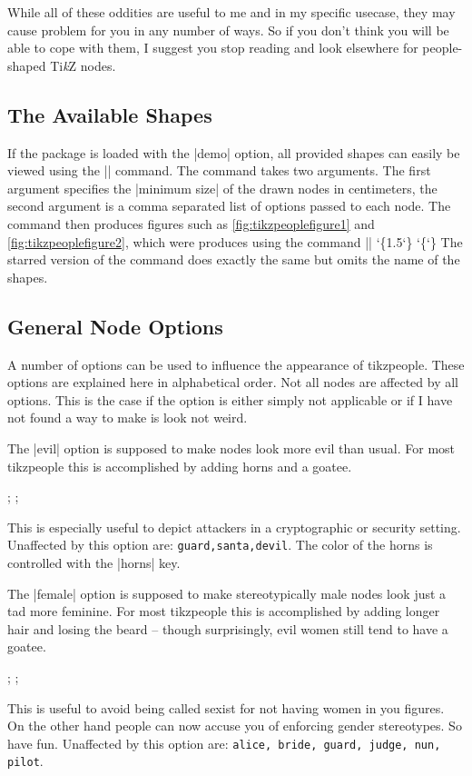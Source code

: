 \documentclass{ltxdoc}
\newcommand{\tikzname}{Ti\emph{k}Z\xspace}
\newcommand{\varg}[1]{%
	{\ttfamily\char`\{}#1{\ttfamily\char`\}}}
\newcommand{\DescribeOption}[1]{\leavevmode
	\marginpar{\raggedleft\strut\MacroFont\string #1\ }}
\begin{document}
	While all of these oddities are useful to me and in my specific usecase, they may cause problem for you in any number of ways.
	So if you don't think you will be able to cope with them, I suggest you stop reading and look elsewhere for people-shaped \tikzname nodes.

\subsection{The Available Shapes}
	\DescribeMacro{\alltikzpeople} If the package is loaded with the |demo| option, all provided shapes can easily be viewed using the |\alltikzpeople|\allowbreak{}\allowbreak{} command.
	The command takes two arguments. 
	The first argument specifies the |minimum size| of the drawn nodes in centimeters, the second argument is a comma separated list of options passed to each node.
	The command then produces figures such as \autoref{fig:tikzpeoplefigure1} and \autoref{fig:tikzpeoplefigure2}, which were produces using the command |\alltikzpeople|\varg{1.5}\varg{}
	\DescribeMacro{\alltikzpeople*} The starred version of the command does exactly the same but omits the name of the shapes.
\subsection{General Node Options}
	A number of options can be used to influence the appearance of \textsf{tikzpeople}.
	These options are explained here in alphabetical order.
	Not all nodes are affected by all options.
	This is the case if the option is either simply not applicable or if I have not found a way to make is look not weird.
	
	\DescribeOption{evil}	The |evil| option is supposed to make nodes look more evil than usual.
	For most tikzpeople this is accomplished by adding horns and a goatee.
	\begin{codeexample}{3.2cm}
\node[priest,minimum size=1cm,xshift=-1.2cm]{};
\node[priest,evil,minimum size=1cm] {};
	\end{codeexample}
	This is especially useful to depict attackers in a cryptographic or security setting.
	Unaffected by this option are: \texttt{guard,santa,devil}.
	The color of the horns is controlled with the |horns| key.

	\DescribeOption{female}	The |female| option is supposed to make stereotypically male nodes look just a tad more feminine.
		For most tikzpeople this is accomplished by adding longer hair and losing the beard -- though surprisingly, evil women still tend to have a goatee.
		\begin{codeexample}{3.2cm}
\node[conductor,minimum size=1cm,xshift=-1.2cm]{};
\node[conductor,female,minimum size=1cm]{};
		\end{codeexample}
		This is useful to avoid being called sexist for not having women in you figures.
		On the other hand people can now accuse you of enforcing gender stereotypes. So have fun.
		Unaffected by this option are: \texttt{alice, bride, guard, judge, nun, pilot}.
\end{document}
